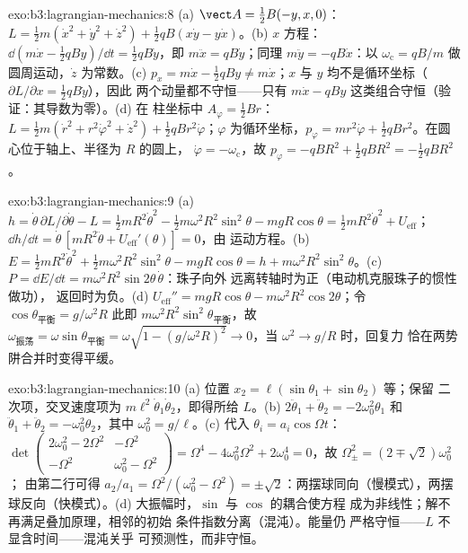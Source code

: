 \begin{solution}{exo:b3:lagrangian-mechanics:8}
(a) $\vect A = \tfrac12 B(-y, x, 0)$：
$L = \tfrac12 m(\dot x^2 + \dot y^2 + \dot z^2) + \tfrac12 qB(x\dot y -
y\dot x)$。(b) $x$ 方程：$\dd(m\dot x - \tfrac12 qBy)/\dd t =
\tfrac12 qB\dot y$，即 $m\ddot x = qB\dot y$；同理 $m\ddot y =
-qB\dot x$：以 $\omega_{\text{c}} = qB/m$ 做圆周运动，$\dot z$
为常数。(c) $p_x = m\dot x - \tfrac12 qBy \neq m\dot x$；$x$ 与
$y$ 均不是循环坐标（$\partial L/\partial x = \tfrac12 qB\dot y$），因此
两个动量都不守恒——只有 $m\dot x -
qBy$ 这类组合守恒（验证：其导数为零）。(d) 在
柱坐标中 $A_\varphi = \tfrac12 Br$：
$L = \tfrac12 m(\dot r^2 + r^2\dot\varphi^2 + \dot z^2) + \tfrac12
qBr^2\dot\varphi$；$\varphi$ 为循环坐标，$p_\varphi = mr^2\dot\varphi +
\tfrac12 qBr^2$。在圆心位于轴上、半径为 $R$ 的圆上，
$\dot\varphi = -\omega_{\text{c}}$，故 $p_\varphi = -qBR^2 + \tfrac12
qBR^2 = -\tfrac12 qBR^2$。
\end{solution}

\begin{solution}{exo:b3:lagrangian-mechanics:9}
(a) $h = \dot\theta\,\partial L/\partial\dot\theta - L = \tfrac12
mR^2\dot\theta^2 - \tfrac12 m\omega^2R^2\sin^2\theta - mgR\cos\theta =
\tfrac12 mR^2\dot\theta^2 + U_{\text{eff}}$；$\dd h/\dd t =
\dot\theta\,[mR^2\ddot\theta + U_{\text{eff}}'(\theta)] = 0$，由
运动方程。(b) $E = \tfrac12 mR^2\dot\theta^2 + \tfrac12
m\omega^2R^2\sin^2\theta - mgR\cos\theta = h +
m\omega^2R^2\sin^2\theta$。(c) $P = \dd E/\dd t =
m\omega^2R^2\sin2\theta\,\dot\theta$：珠子向外
远离转轴时为正（电动机克服珠子的惯性做功），
返回时为负。(d) $U_{\text{eff}}'' = mgR\cos\theta -
m\omega^2R^2\cos2\theta$；令 $\cos\theta_{\text{平衡}} = g/\omega^2R$
此即 $m\omega^2R^2\sin^2\theta_{\text{平衡}}$，故
$\omega_{\text{振荡}} = \omega\sin\theta_{\text{平衡}} = \omega\sqrt{1 -
(g/\omega^2R)^2} \to 0$，当 $\omega^2 \to g/R$ 时，回复力
恰在两势阱合并时变得平缓。
\end{solution}

\begin{solution}{exo:b3:lagrangian-mechanics:10}
(a) 位置 $x_2 = \ell(\sin\theta_1 + \sin\theta_2)$ 等；保留
二次项，交叉速度项为
$m\ell^2\dot\theta_1\dot\theta_2$，即得所给 $L$。(b)
$2\ddot\theta_1 + \ddot\theta_2 = -2\omega_0^2\theta_1$ 和
$\ddot\theta_1 + \ddot\theta_2 = -\omega_0^2\theta_2$，其中 $\omega_0^2
= g/\ell$。(c) 代入 $\theta_i = a_i\cos\Omega t$：
$\det\begin{pmatrix} 2\omega_0^2 - 2\Omega^2 & -\Omega^2\\ -\Omega^2 &
\omega_0^2 - \Omega^2\end{pmatrix} = \Omega^4 - 4\omega_0^2\Omega^2 +
2\omega_0^4 = 0$，故 $\Omega_\pm^2 = (2 \mp \sqrt2)\omega_0^2$；
由第二行可得 $a_2/a_1 = \Omega^2/(\omega_0^2 - \Omega^2) =
\pm\sqrt2$：两摆球同向（慢模式），两摆球反向（快模式）。(d)
大振幅时，$\sin$ 与 $\cos$ 的耦合使方程
成为非线性；解不再满足叠加原理，相邻的初始
条件指数分离（混沌）。能量仍
严格守恒——$L$ 不显含时间——混沌关乎
可预测性，而非守恒。
\end{solution}

